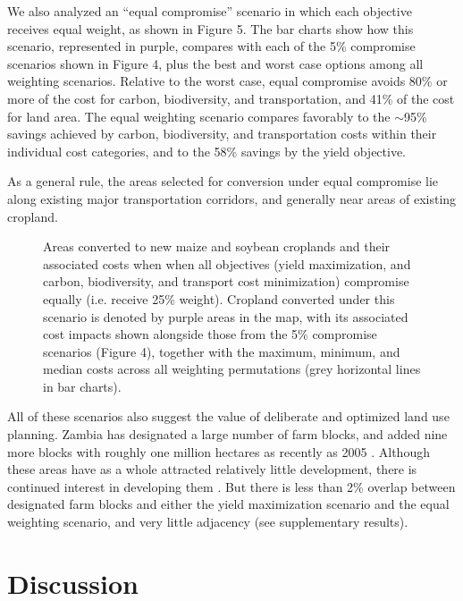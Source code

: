 \documentclass[a4paper]{article}
\begin{document}
{We also analyzed an ``equal compromise''  scenario in which each objective receives equal weight, as shown in Figure 5.  The bar charts show how this scenario, represented in purple, compares with each of the 5\% compromise scenarios shown in Figure 4, plus the best and worst case options among all weighting scenarios. Relative to the worst case, equal compromise avoids 80\% or more of the cost for carbon, biodiversity, and transportation, and 41\% of the cost for land area. The equal weighting scenario compares favorably to the $\sim$95\% savings achieved by carbon, biodiversity, and transportation costs within their individual cost categories, and to the 58\% savings by the yield objective. 

As a general rule, the areas selected for conversion under equal compromise lie along existing major transportation corridors, and generally near areas of existing cropland.

 \begin{figure}[!ht]
  \begin{center}
    \caption{Areas converted to new maize and soybean croplands and their associated costs when when all objectives (yield maximization, and carbon, biodiversity, and transport cost minimization) compromise equally (i.e. receive 25\% weight). Cropland converted under this scenario is denoted by purple areas in the map, with its associated cost impacts shown alongside those from the 5\% compromise scenarios (Figure 4), together with the maximum, minimum, and median costs across all weighting permutations (grey horizontal lines in bar charts).}
    \label{default}
  \end{center}
\end{figure}

All of these scenarios also suggest the value of deliberate and optimized land use planning.  Zambia has designated a large number of farm blocks, and added nine more blocks with roughly one million hectares as recently as 2005 \citep{anonymous_farm_2005}. Although these areas have as a whole attracted relatively little development, there is continued interest in developing them \citep{anonymous_undeveloped_2015}. But there is less than 2\% overlap between designated farm blocks and either the yield maximization scenario and the equal weighting scenario, and very little adjacency (see supplementary results). 

\section*{\large Discussion}

}
\end{document}
